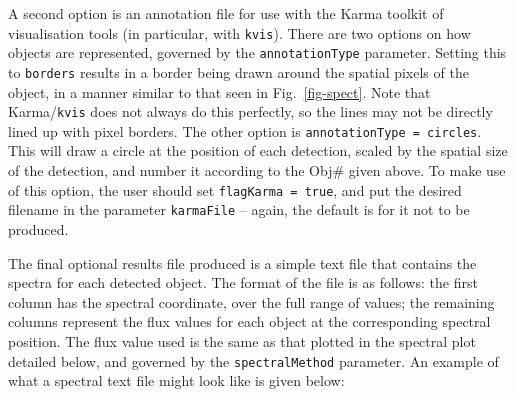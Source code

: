 A second option is an annotation file for use with the Karma toolkit
of visualisation tools (in particular, with \texttt{kvis}). There are
two options on how objects are represented, governed by the
\texttt{annotationType} parameter. Setting this to \texttt{borders}
results in a border being drawn around the spatial pixels of the
object, in a manner similar to that seen in Fig.~\ref{fig-spect}. Note
that Karma/\texttt{kvis} does not always do this perfectly, so the
lines may not be directly lined up with pixel borders. The other
option is \texttt{annotationType = circles}. This will draw a circle
at the position of each detection, scaled by the spatial size of the
detection, and number it according to the Obj\# given above. To make
use of this option, the user should set \texttt{flagKarma = true}, and
put the desired filename in the parameter \texttt{karmaFile} -- again,
the default is for it not to be produced.

The final optional results file produced is a simple text file that
contains the spectra for each detected object. The format of the file
is as follows: the first column has the spectral coordinate, over the
full range of values; the remaining columns represent the flux values
for each object at the corresponding spectral position. The flux value
used is the same as that plotted in the spectral plot detailed below,
and governed by the \texttt{spectralMethod} parameter. An example of
what a spectral text file might look like is given below:

